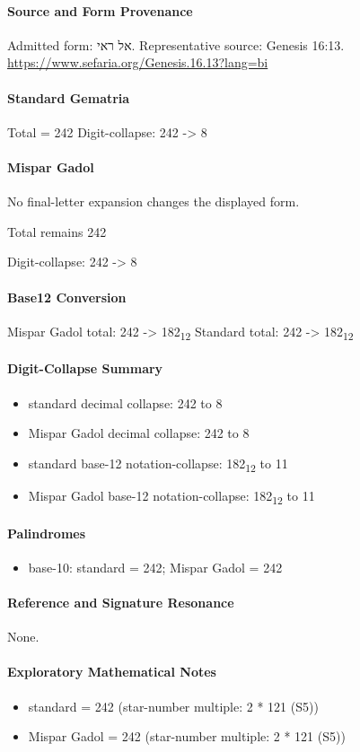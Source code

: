 \paragraph{Source and Form Provenance}
Admitted form: אל ראי.
Representative source: Genesis 16:13.
\url{https://www.sefaria.org/Genesis.16.13?lang=bi}
\paragraph{Standard Gematria}
Total = 242
Digit-collapse: 242 -> 8
\paragraph{Mispar Gadol}
No final-letter expansion changes the displayed form.

Total remains 242

Digit-collapse: 242 -> 8
\paragraph{Base12 Conversion}
Mispar Gadol total: 242 -> 182\textsubscript{12}
Standard total: 242 -> 182\textsubscript{12}
\paragraph{Digit-Collapse Summary}
\begin{itemize}
\item standard decimal collapse: 242 to 8
\item Mispar Gadol decimal collapse: 242 to 8
\item standard base-12 notation-collapse: 182\textsubscript{12} to 11
\item Mispar Gadol base-12 notation-collapse: 182\textsubscript{12} to 11
\end{itemize}
\paragraph{Palindromes}
\begin{itemize}
\item base-10: standard = 242; Mispar Gadol = 242
\end{itemize}
\paragraph{Reference and Signature Resonance}
None.
\paragraph{Exploratory Mathematical Notes}
\begin{itemize}
\item standard = 242 (star-number multiple: 2 * 121 (S5))
\item Mispar Gadol = 242 (star-number multiple: 2 * 121 (S5))
\end{itemize}
